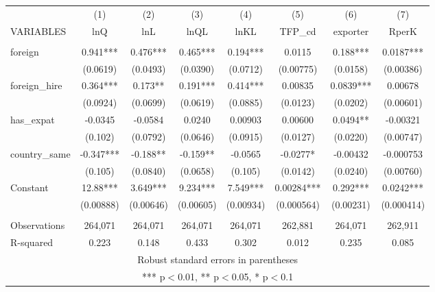 \documentclass[]{article}
\begin{document}
\begin{tabular}{lccccccc} \hline
 & (1) & (2) & (3) & (4) & (5) & (6) & (7) \\
VARIABLES & lnQ & lnL & lnQL & lnKL & TFP\_cd & exporter & RperK \\ \hline
 &  &  &  &  &  &  &  \\
foreign & 0.941*** & 0.476*** & 0.465*** & 0.194*** & 0.0115 & 0.188*** & 0.0187*** \\
 & (0.0619) & (0.0493) & (0.0390) & (0.0712) & (0.00775) & (0.0158) & (0.00386) \\
foreign\_hire & 0.364*** & 0.173** & 0.191*** & 0.414*** & 0.00835 & 0.0839*** & 0.00678 \\
 & (0.0924) & (0.0699) & (0.0619) & (0.0885) & (0.0123) & (0.0202) & (0.00601) \\
has\_expat & -0.0345 & -0.0584 & 0.0240 & 0.00903 & 0.00600 & 0.0494** & -0.00321 \\
 & (0.102) & (0.0792) & (0.0646) & (0.0915) & (0.0127) & (0.0220) & (0.00747) \\
country\_same & -0.347*** & -0.188** & -0.159** & -0.0565 & -0.0277* & -0.00432 & -0.000753 \\
 & (0.105) & (0.0840) & (0.0658) & (0.105) & (0.0142) & (0.0240) & (0.00760) \\
Constant & 12.88*** & 3.649*** & 9.234*** & 7.549*** & 0.00284*** & 0.292*** & 0.0242*** \\
 & (0.00888) & (0.00646) & (0.00605) & (0.00934) & (0.000564) & (0.00231) & (0.000414) \\
 &  &  &  &  &  &  &  \\
Observations & 264,071 & 264,071 & 264,071 & 264,071 & 262,881 & 264,071 & 262,911 \\
 R-squared & 0.223 & 0.148 & 0.433 & 0.302 & 0.012 & 0.235 & 0.085 \\ \hline
\multicolumn{8}{c}{ Robust standard errors in parentheses} \\
\multicolumn{8}{c}{ *** p$<$0.01, ** p$<$0.05, * p$<$0.1} \\
\end{tabular}
\end{document}
